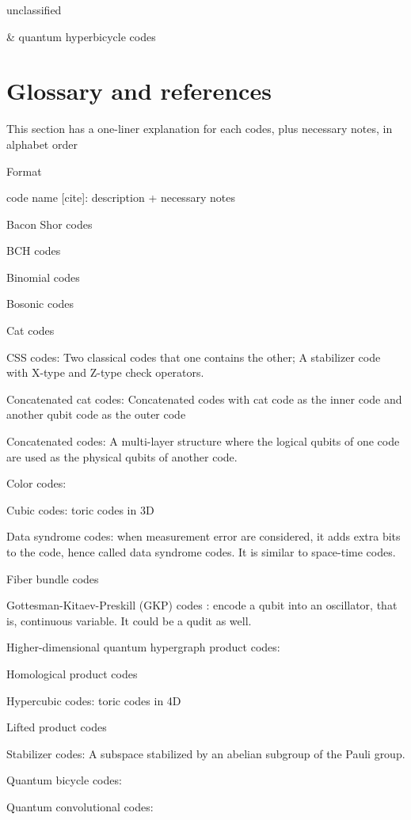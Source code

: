\documentclass[aps,%
pra, twocolumn,%
notitlepage,longbibliography]{revtex4-2}
\begin{document}
unclassified
\begin{easylist}
  & quantum hyperbicycle codes\cite{kovalev1212quantum}
  
\end{easylist}
  
\section{Glossary and references}
This section has a one-liner explanation for each codes, plus
necessary notes, in alphabet order

Format

code name [cite]: description + necessary notes

Bacon Shor codes

BCH codes

Binomial codes

Bosonic codes

Cat codes

CSS codes: Two classical codes that one contains the other; A
stabilizer code with X-type and Z-type check operators.

Concatenated cat codes: Concatenated codes with cat code as the inner
code and another qubit code as the outer code

Concatenated codes: A multi-layer structure where the logical qubits
of one code are used as the physical qubits of another code.


Color codes:

Cubic codes: toric codes in 3D

Data syndrome codes: when measurement error are considered, it adds
extra bits to the code, hence called data syndrome codes. It is
similar to space-time codes.

Fiber bundle codes

Gottesman-Kitaev-Preskill (GKP) codes \cite{gottesman2001encoding}: encode a qubit into an
oscillator, that is, continuous variable. It could be a qudit as well.


Higher-dimensional quantum hypergraph product codes:

Homological product codes

Hypercubic codes: toric codes in 4D


Lifted product codes

Stabilizer codes: A subspace stabilized by an abelian subgroup of the
Pauli group.


Quantum bicycle codes:

Quantum convolutional codes:
\end{document}
